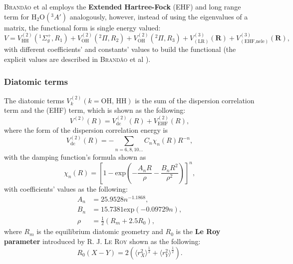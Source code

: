 \documentclass[12pt]{article}
\begin{document}
\textsc{Brandão} et al \cite{idx154} employs the \textbf{Extended Hartree-Fock} (EHF) and long range term for H$_2$O$(^3A')$ analogously, however, instead of using the eigenvalues of a matrix, the functional form is single energy valued:
\begin{equation}
    V = V^{(2)}_{\text{HH}}(^1\Sigma_g^+,R_1) + V^{(2)}_{\text{OH}}(^2\Pi,R_2)+V^{(2)}_{\text{OH}}(^2\Pi,R_3)+V^{(3)}_{(\text{LR})}(\mathbf{R})+V^{(3)}_{(\text{EHF,nele})}(\mathbf{R}),
\label{eqehflr2}
\end{equation}
with different coefficients' and constants' values to build the functional (the explicit values are described in \textsc{Brandão} et al \cite{idx154}).


\subsubsection{Diatomic terms}
\label{subsubdiatomic}
The diatomic terms $V_k^{(2)} (k = \text{OH, HH})$ is the sum of the dispersion correlation term and the (EHF) term, which is shown as the following:
\begin{equation}
    V^{(2)}(R) = V^{(2)}_{\text{dc}}(R) + V^{(2)}_{\text{EHF}}(R),
    \label{eqsubehfdiatomic}
\end{equation}
where the form of the dispersion correlation energy is
\begin{equation}
    V_{\text{dc}}^{(2)}(R) = - \sum_{n=6,8,10...} C_n\chi_n(R)R^{-n},
\end{equation}
with the damping function's formula shown as
\begin{equation}
    \chi_n(R) = \left[1-\text{exp}\left(-\frac{A_nR}{\rho}-\frac{B_nR^2}{\rho^2}\right)\right]^n,
\end{equation}
with coefficients' values as the following:
\begin{equation}
    \begin{split}
        A_n &= 25.9528n^{-1.1868}, \\
        B_n &= 15.7381\text{exp}(-0.09729n), \\
        \rho &= \frac{1}{2}(R_m + 2.5R_0),
    \end{split}
    \label{eqehfcoef}
\end{equation}
where $R_m$ is the equilibrium diatomic geometry and $R_0$ is the \textbf{Le Roy parameter} introduced by \textsc{R. J. Le Roy} \cite{leroy} shown as the following:
\begin{equation}
    R_0(X-Y) = 2\left(\langle r^2_X\rangle^\frac{1}{2} + \langle r^2_Y\rangle^\frac{1}{2} \right).
\end{equation}
\end{document}
